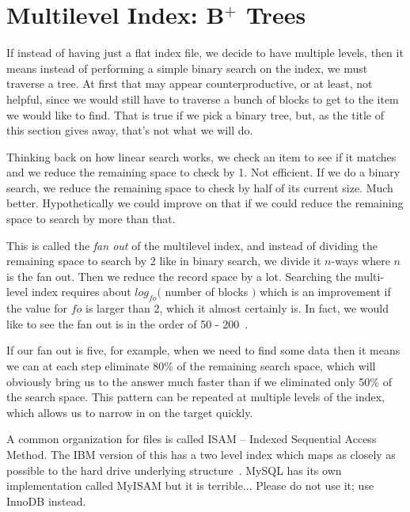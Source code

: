 




\section*{Multilevel Index: B$^{+}$ Trees}

If instead of having just a flat index file, we decide to have multiple levels, then it means instead of performing a simple binary search on the index, we must traverse a tree. At first that may appear counterproductive, or at least, not helpful, since we would still have to traverse a bunch of blocks to get to the item we would like to find. That is true if we pick a binary tree, but, as the title of this section gives away, that's not what we will do.

Thinking back on how linear search works, we check an item to see if it matches and we reduce the remaining space to check by 1. Not efficient. If we do a binary search, we reduce the remaining space to check by half of its current size. Much better. Hypothetically we could improve on that if we could reduce the remaining space to search by more than that. 

This is called the \textit{fan out} of the multilevel index, and instead of dividing the remaining space to search by 2 like in binary search, we divide it $n$-ways where $n$ is the fan out. Then we reduce the record space by a lot. Searching the multi-level index requires about $log_{fo}($ number of blocks $)$ which is an improvement if the value for $fo$ is larger than 2, which it almost certainly is. In fact, we would like to see the fan out is in the order of 50 - 200~\cite{fds}.

If our fan out is five, for example, when we need to find some data then it means we can at each step eliminate 80\% of the remaining search space, which will obviously bring us to the answer much faster than if we eliminated only 50\% of the search space. This pattern can be repeated at multiple levels of the index, which allows us to narrow in on the target quickly.

A common organization for files is called ISAM -- Indexed Sequential Access Method. The IBM version of this has a two level index which maps as closely as possible to the hard drive underlying structure~\cite{fds}. MySQL has its own implementation called MyISAM but it is terrible... Please do not use it; use InnoDB instead. 

